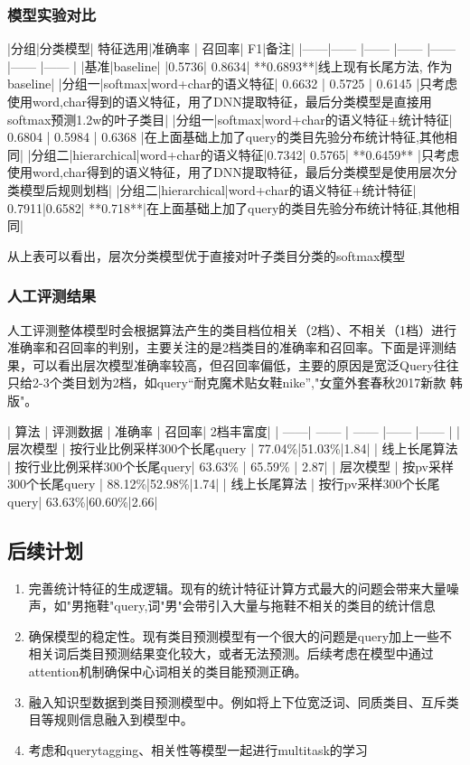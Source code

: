 \subsubsection{模型实验对比}
|分组|分类模型| 特征选用|准确率 | 召回率| F1|备注|
|------|------ |------ |------ |------ |------ |------ |
|基准|baseline| |0.5736| 0.8634| **0.6893**|线上现有长尾方法, 作为baseline|
|分组一|softmax|word+char的语义特征| 0.6632 | 0.5725 | 0.6145 |只考虑使用word,char得到的语义特征，用了DNN提取特征，最后分类模型是直接用softmax预测1.2w的叶子类目|
|分组一|softmax|word+char的语义特征+统计特征| 0.6804 | 0.5984 | 0.6368 |在上面基础上加了query的类目先验分布统计特征,其他相同|
|分组二|hierarchical|word+char的语义特征|0.7342| 0.5765| **0.6459** |只考虑使用word,char得到的语义特征，用了DNN提取特征，最后分类模型是使用层次分类模型后规则划档|
|分组二|hierarchical|word+char的语义特征+统计特征| 0.7911|0.6582| **0.718**|在上面基础上加了query的类目先验分布统计特征,其他相同|

从上表可以看出，层次分类模型优于直接对叶子类目分类的softmax模型

\subsubsection{人工评测结果}
人工评测整体模型时会根据算法产生的类目档位相关（2档）、不相关（1档）进行准确率和召回率的判别，主要关注的是2档类目的准确率和召回率。下面是评测结果，可以看出层次模型准确率较高，但召回率偏低，主要的原因是宽泛Query往往只给2-3个类目划为2档，如query“耐克魔术贴女鞋nike”,"女童外套春秋2017新款 韩版"。

| 算法 | 评测数据 | 准确率 | 召回率| 2档丰富度|
| ------| ------ | ------ |------ |------ |
| 层次模型 | 按行业比例采样300个长尾query | 77.04\%|51.03\%|1.84|
| 线上长尾算法 | 按行业比例采样300个长尾query| 63.63\%  | 65.59\% | 2.87|
| 层次模型 | 按pv采样300个长尾query | 88.12\%|52.98\%|1.74|
| 线上长尾算法 | 按行pv采样300个长尾query| 63.63\%|60.60\%|2.66|

\subsection{后续计划}
\begin{enumerate}
\item 完善统计特征的生成逻辑。现有的统计特征计算方式最大的问题会带来大量噪声，如"男拖鞋"query,词"男"会带引入大量与拖鞋不相关的类目的统计信息
\item 确保模型的稳定性。现有类目预测模型有一个很大的问题是query加上一些不相关词后类目预测结果变化较大，或者无法预测。后续考虑在模型中通过attention机制确保中心词相关的类目能预测正确。
\item 融入知识型数据到类目预测模型中。例如将上下位宽泛词、同质类目、互斥类目等规则信息融入到模型中。
\item 考虑和querytagging、相关性等模型一起进行multitask的学习
\end{enumerate}



